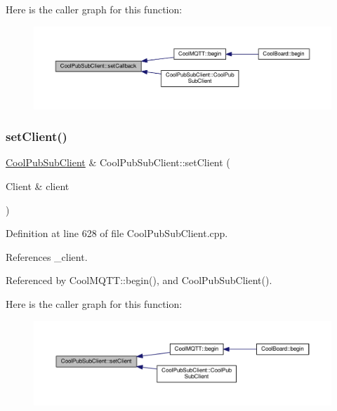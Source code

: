 Here is the caller graph for this function\+:
\nopagebreak
\begin{figure}[H]
\begin{center}
\leavevmode
\includegraphics[width=350pt]{d8/d4b/class_cool_pub_sub_client_ac5cab7658f1bdded32131241e468e661_icgraph}
\end{center}
\end{figure}
\mbox{\label{class_cool_pub_sub_client_a7ee119b786010561ab6a9afa0798e91d}} 
\subsubsection{\texorpdfstring{set\+Client()}{setClient()}}
{\footnotesize\ttfamily \hyperlink{class_cool_pub_sub_client}{Cool\+Pub\+Sub\+Client} \& Cool\+Pub\+Sub\+Client\+::set\+Client (\begin{DoxyParamCaption}\item[{Client \&}]{client }\end{DoxyParamCaption})}



Definition at line 628 of file Cool\+Pub\+Sub\+Client.\+cpp.



References \+\_\+client.



Referenced by Cool\+M\+Q\+T\+T\+::begin(), and Cool\+Pub\+Sub\+Client().

Here is the caller graph for this function\+:
\nopagebreak
\begin{figure}[H]
\begin{center}
\leavevmode
\includegraphics[width=350pt]{d8/d4b/class_cool_pub_sub_client_a7ee119b786010561ab6a9afa0798e91d_icgraph}
\end{center}
\end{figure}
\mbox{\label{class_cool_pub_sub_client_ae97e40823ea689ff9e36d5bdd71bb933}} 
